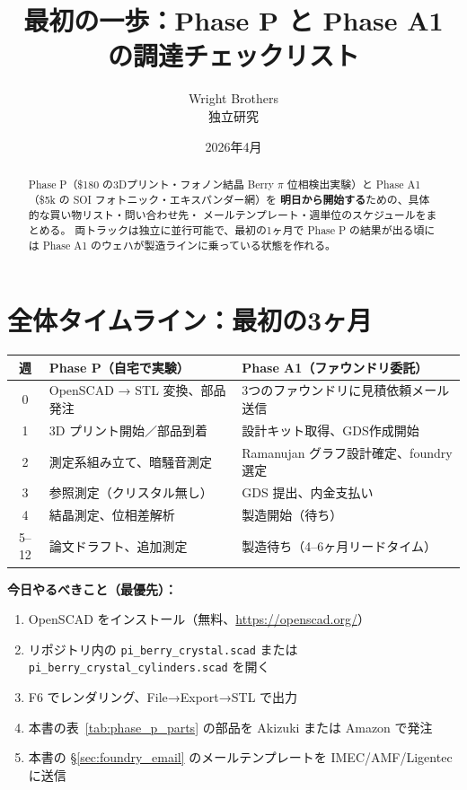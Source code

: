 \documentclass[11pt,a4paper]{article}
\title{最初の一歩：Phase P と Phase A1 の調達チェックリスト}
\author{Wright Brothers\\{\small 独立研究}}
\date{2026年4月}
\begin{document}
\maketitle

\begin{abstract}
Phase P（\$180 の3Dプリント・フォノン結晶 Berry $\pi$ 位相検出実験）と
Phase A1（\$5k の SOI フォトニック・エキスパンダー網）を
\textbf{明日から開始する}ための、具体的な買い物リスト・問い合わせ先・
メールテンプレート・週単位のスケジュールをまとめる。
両トラックは独立に並行可能で、最初の1ヶ月で Phase P の結果が出る頃には
Phase A1 のウェハが製造ラインに乗っている状態を作れる。
\end{abstract}

\section{全体タイムライン：最初の3ヶ月}

\begin{center}
\begin{tabular}{c|p{5.5cm}|p{5.5cm}}
\toprule
週 & Phase P（自宅で実験） & Phase A1（ファウンドリ委託） \\
\midrule
0 & OpenSCAD → STL 変換、部品発注 & 3つのファウンドリに見積依頼メール送信 \\
1 & 3D プリント開始／部品到着 & 設計キット取得、GDS作成開始 \\
2 & 測定系組み立て、暗騒音測定 & Ramanujan グラフ設計確定、foundry 選定 \\
3 & 参照測定（クリスタル無し） & GDS 提出、内金支払い \\
4 & 結晶測定、位相差解析 & 製造開始（待ち） \\
5--12 & 論文ドラフト、追加測定 & 製造待ち（4--6ヶ月リードタイム） \\
\bottomrule
\end{tabular}
\end{center}

\textbf{今日やるべきこと（最優先）：}
\begin{enumerate}[leftmargin=2em,nosep]
  \item OpenSCAD をインストール（無料、\url{https://openscad.org/}）
  \item リポジトリ内の \texttt{pi\_berry\_crystal.scad} または
        \texttt{pi\_berry\_crystal\_cylinders.scad} を開く
  \item F6 でレンダリング、File→Export→STL で出力
  \item 本書の表~\ref{tab:phase_p_parts} の部品を Akizuki または Amazon で発注
  \item 本書の §\ref{sec:foundry_email} のメールテンプレートを IMEC/AMF/Ligentec に送信
\end{enumerate}
\end{document}
